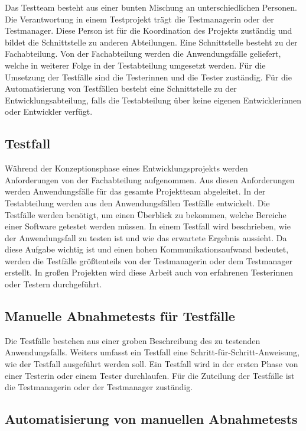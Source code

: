 Das Testteam besteht aus einer bunten Mischung an unterschiedlichen Personen. Die Verantwortung in einem Testprojekt trägt die Testmanagerin oder der Testmanager. Diese Person ist für die Koordination des Projekts zuständig und bildet die Schnittstelle zu anderen Abteilungen. Eine Schnittstelle besteht zu der Fachabteilung. Von der Fachabteilung werden die Anwendungsfälle geliefert, welche in weiterer Folge in der Testabteilung umgesetzt werden. Für die Umsetzung der Testfälle sind die Testerinnen und die Tester zuständig. Für die Automatisierung von Testfällen besteht eine Schnittstelle zu der Entwicklungsabteilung, falls die Testabteilung über keine eigenen Entwicklerinnen oder Entwickler verfügt.

\subsection{Testfall}

Während der Konzeptionsphase eines Entwicklungsprojekts werden Anforderungen von der Fachabteilung aufgenommen. Aus diesen Anforderungen werden Anwendungsfälle für das gesamte Projektteam abgeleitet. In der Testabteilung werden aus den Anwendungsfällen Testfälle entwickelt. Die Testfälle werden benötigt, um einen Überblick zu bekommen, welche Bereiche einer Software getestet werden müssen. In einem Testfall wird beschrieben, wie der Anwendungsfall zu testen ist und wie das erwartete Ergebnis aussieht. Da diese Aufgabe wichtig ist und einen hohen Kommunikationsaufwand bedeutet, werden die Testfälle größtenteils von der Testmanagerin oder dem Testmanager erstellt. In großen Projekten wird diese Arbeit auch von erfahrenen Testerinnen oder Testern durchgeführt. 

\subsection{Manuelle Abnahmetests für Testfälle}

Die Testfälle bestehen aus einer groben Beschreibung des zu testenden Anwendungsfalls. Weiters umfasst ein Testfall eine Schritt-für-Schritt-Anweisung, wie der Testfall ausgeführt werden soll. Ein Testfall wird in der ersten Phase von einer Testerin oder einem Tester durchlaufen. Für die Zuteilung der Testfälle ist die Testmanagerin oder der Testmanager zuständig. 

\subsection{Automatisierung von manuellen Abnahmetests}

